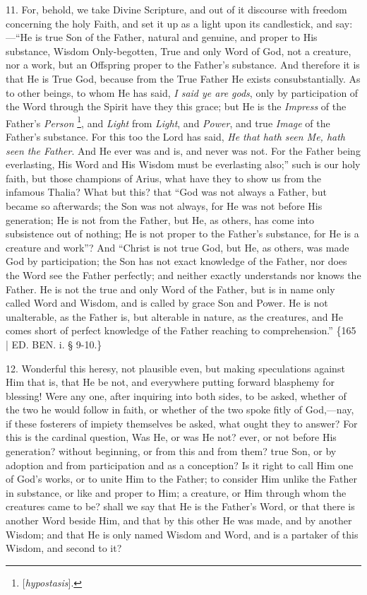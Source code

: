 11. For, behold, we take
Divine Scripture, and out of it discourse with freedom concerning the
holy Faith, and set it up as a light upon its candlestick, and say:—``He
is true Son of the Father, natural and genuine, and proper to His
substance, Wisdom Only-begotten, True and only Word of God, not a
creature, nor a work, but an Offspring proper to the Father's
substance. And therefore it is that He is True God, because from the
True Father He exists consubstantially. As to other beings, to whom He
has said, \emph{I said ye are gods}, only by participation of the Word
through the Spirit have they this grace; but He is the \emph{Impress}
of the Father's \emph{Person} \footnote{[\emph{hypostasis}].}, and \emph{Light} from \emph{Light}, and \emph{Power}, and
true \emph{Image} of the Father's substance. For this too the Lord has
said, \emph{He that hath seen Me, hath seen the Father}. And He ever
was and is, and never was not. For the Father being everlasting, His
Word and His Wisdom must be everlasting also;'' such is our holy faith,
but those champions of Arius, what have they to show us from the
infamous Thalia? What but this? that ``God was not always a Father, but
became so afterwards; the Son was not always, for He was not before
His generation; He is not from the Father, but He, as others, has come
into subsistence out of nothing; He is not proper to the Father's
substance, for He is a creature and work''? And ``Christ is not true
God, but He, as others, was made God by participation; the Son has not
exact knowledge of the Father, nor does the Word see the Father
perfectly; and neither exactly understands nor knows the Father. He is
not the true and only Word of the Father, but is in name only called
Word and Wisdom, and is called by grace Son and Power. He is not
unalterable, as the Father is, but alterable in nature, as the
creatures, and He comes short of perfect knowledge of the Father
reaching to comprehension.'' \{165 | ED. BEN.
i. § 9-10.\}

12. Wonderful this heresy, not
plausible even, but making speculations against Him that is, that He
be not, and everywhere putting forward blasphemy for blessing! Were
any one, after inquiring into both sides, to be asked, whether of the
two he would follow in faith, or whether of the two spoke fitly of
God,—nay, if these fosterers of impiety themselves be asked, what
ought they to answer? For this is the cardinal question, Was He, or
was He not? ever, or not before His generation? without beginning, or
from this and from them? true Son, or by adoption and from
participation and as a conception? Is it right to call Him one of God's
works, or to unite Him to the Father; to consider Him unlike the
Father in substance, or like and proper to Him; a creature, or Him
through whom the creatures came to be? shall we say that He is the
Father's Word, or that there is another Word beside Him, and that by
this other He was made, and by another Wisdom; and that He is only
named Wisdom and Word, and is a partaker of this Wisdom, and second to
it?

